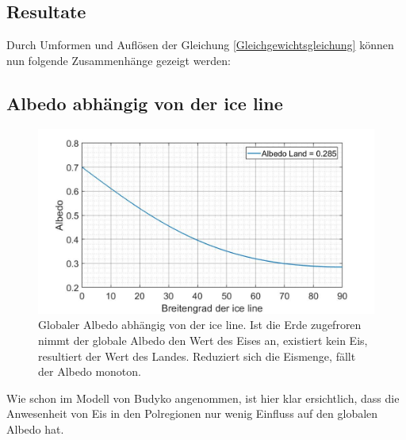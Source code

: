 \begin{refsection}
\section{Resultate} \label{Resultate}
Durch Umformen und Auflösen der Gleichung \ref{Gleichgewichtsgleichung} können nun folgende Zusammenhänge gezeigt werden:
\subsection{Albedo abhängig von der ice line}
\begin{figure}[H]
	\centering
	\includegraphics[width=14cm]{eis/Albedo_abh_von_der_ice_line.jpg}
	\caption{Globaler Albedo abhängig von der ice line. Ist die Erde zugefroren nimmt der globale Albedo den Wert des Eises an, existiert kein Eis, resultiert der Wert des Landes. Reduziert sich die Eismenge, fällt der Albedo monoton.}
\end{figure}
Wie schon im Modell von Budyko angenommen, ist hier klar ersichtlich, dass die Anwesenheit von Eis in den Polregionen nur wenig Einfluss auf den globalen Albedo hat. 

\end{refsection}
